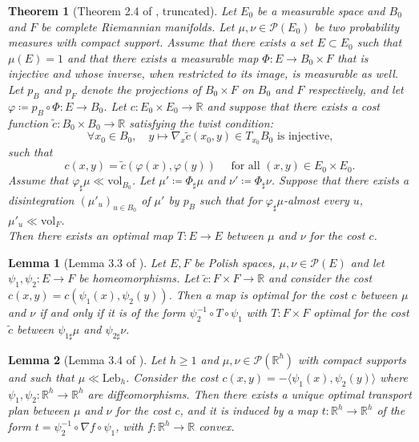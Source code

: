 \documentclass{article}
\newcommand{\R}{\mathbb{R}}
\newcommand{\1}{\mathbf{1}}
\newcommand{\Leb}{\mathrm{Leb}}
\renewcommand{\P}{\mathcal{P}}
\newtheorem{theorem}{Theorem}
\newtheorem{lemma}{Lemma}
\theoremstyle{definition}
\theoremstyle{remark}
\begin{document}
\begin{appendices}
\begin{theorem}[Theorem 2.4 of \cite{dumont2025existence}, truncated]
    \label{theo:fibers-main}
    Let $E_0$ be a measurable space and $B_0$ and $F$ be complete Riemannian manifolds.
    Let $\mu,\nu \in \P(E_0)$ be two probability measures with compact support.
    Assume that there exists a set $E\subset E_0$ such that $\mu(E) = 1$ and that there exists a measurable map $\Phi : E \to B_0 \times F$ that is injective and whose inverse, when restricted to its image, is measurable as well.
    Let $p_B$ and $p_F$ denote the projections of $B_0 \times F$ on $B_0$ and $F$ respectively, and
    let $\varphi\coloneqq p_ B \circ \Phi: E\to B_0$.
    Let $c: E_0 \times E_0 \to \R$ and suppose that there exists a cost function $\tilde c: B_0 \times B_0 \to \R$ satisfying the twist condition:
    \[ \forall x_0\in B_0,\quad  y\mapsto \nabla_x \tilde c(x_0,y)\in T_{x_0}B_0 \text{ is injective,}\]
    such that
    \begin{equation*}
    c(x,y)=\tilde c(\varphi(x),\varphi(y))\quad \text{ for all } (x,y)\in E_0\times E_0.
    \end{equation*}
    Assume that $\varphi_\sharp\mu\ll\mathrm{vol}_{B_0}$. Let $\mu' \coloneqq \Phi_\sharp\mu$ and $\nu' \coloneqq \Phi_\sharp\nu$.
    Suppose that there exists a disintegration $(\mu'_u)_{u\in B_0}$ of $\mu'$ by $p_B$ such that for $\varphi_\sharp\mu$-almost every $u$, $\mu'_{u}\ll\mathrm{vol}_F$.\\
    Then there exists an optimal map $T:E\to E$ between $\mu$ and $\nu$ for the cost $c$.
\end{theorem}

\begin{lemma}[Lemma 3.3 of \cite{dumont2025existence}]
    \label{lemma:reparam}
    Let $E,F$ be Polish spaces, $\mu,\nu\in \P(E)$ and let $\psi_1,\psi_2:E\to F$ be homeomorphisms. Let $\tilde c:F\times F\to\R$ and consider the cost $c(x,y)= c( \psi_1(x),\psi_2(y))$. Then a map is optimal for the cost $c$ between $\mu$ and $\nu$ if and only if it is of the form $\psi_2^{-1}\circ T\circ\psi_1$ with $T:F\times F$ optimal for the cost $\tilde c$ between $\psi_{1\sharp}\mu$ and $\psi_{2\sharp}\nu$.
\end{lemma}

\begin{lemma}[Lemma 3.4 of \cite{dumont2025existence}]
    \label{lemma:scaled-Brenier}
    Let $h\geq 1$ and $\mu,\nu\in \P(\R^h)$ with compact supports and such that $\mu\ll\Leb_h$. Consider the cost $c(x, y)= -\langle \psi_1(x),\psi_2(y)\rangle$ where $\psi_1,\psi_2:\R^h\to \R^h$ are diffeomorphisms.
    Then there exists a unique optimal transport plan between $\mu$ and $\nu$ for the cost $c$, and it is induced by a map $t:\R^h\to \R^h$ of the form $t=\psi_2^{-1}\circ\nabla f\circ\psi_1$, with $f:\R^h\to\R$ convex.
\end{lemma}


\end{appendices}
\end{document}
